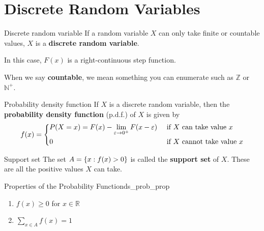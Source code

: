 \section{Discrete Random Variables}
\begin{Definition}{Discrete random variable}{}
    If a random variable $ X $ can only take
    finite or countable values, $ X $
    is a \textbf{discrete random variable}.
\end{Definition}
In this case, $ F(x) $ is a right-continuous
step function.
\begin{Remark}{}{}
    When we say \textbf{countable}, we mean
    something you can enumerate such as $ \mathbb{Z} $ or
    $ \mathbb{N}^+ $.
\end{Remark}

\begin{Definition}{Probability density function}{}
    If $ X $ is a discrete random variable,
    then the \textbf{probability density function} (p.d.f.) of $ X $ is given by
    \[ f(x)=
        \begin{dcases}
            P(X=x)=
            F(x)-\lim\limits_{{\varepsilon} \to {0^+}}
            F(x-\varepsilon) & \text{ if } X\text{ can take value }x    \\
            0                & \text{ if } X\text{ cannot take value }x
        \end{dcases} \]
\end{Definition}

\begin{Definition}{Support set}{}
    The set $ A=\{x:f(x)>0\} $ is called the \textbf{support set}
    of $ X $. These are all the positive values $ X $ can take.
\end{Definition}

\begin{Proposition}{Properties of the Probability Function}{ds_prob_prop}
    \begin{enumerate}[label=(\arabic*)]
        \item $ f(x)\geqslant 0 $ for $ x\in\mathbb{R} $
        \item $ \sum\limits_{x\in A}f(x)=1 $
    \end{enumerate}
\end{Proposition}

